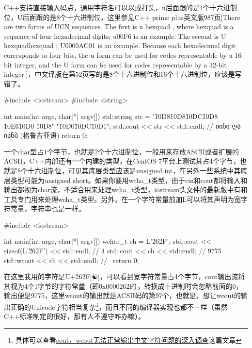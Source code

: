 C++支持直接输入\href{https://home.unicode.org/}{}码点，通用字符名可以以或打头，\mybackslash u后面跟的是4个十六进制位，\mybackslash U后面跟的是8个十六进制位，这里参见C++ prime plus英文版987页[There are two forms of UCN sequences. The first is \mybackslash u hexquad , where hexquad is a sequence of four hexadecimal digits; \mybackslash u00F6 is an example. The second is \mybackslash U hexquadhexquad ; \mybackslash U0000AC01 is an example. Because each hexadecimal digit corresponds to four bits, the \mybackslash u form can be used for codes representable by a 16-bit integer, and the \mybackslash U form can be used for codes representable by a 32-bit integer.]，中文译版在第52页写的是8个十六进制位和16个十六进制位，应该是写错了。

\begin{cpp}
#include <iostream>
#include <string>

int main(int argc, char|*| argv[]) {
    std::string str = "\u10D8\u10D8\u10DC\u10D8 \u10E6\u10D0 \u10D8"
        "\u10D0\u10DC\u10D1";
    std::cout << str << std::endl; // იინი ღა იანბ (格鲁吉亚语)
    return 0;
}
\end{cpp}

一个char型占1个字节，也就是2个十六进制位，一般用来存放ASCII或者扩展的ACSII，C++内部还有一个内建的类型，在CentOS 7平台上测试其占4个字节，也就是8个十六进制位，可见其底层类型应该是unsigned int，在另外一些系统中其底层类型可能为unsigned short。如果你要用wcha\_t类型，由于cin和cout都将输入和输出都视为char流，不适合用来处理wcha\_t类型，iostream头文件的最新版中有和工具专门用来处理wcha\_t类型。另外，在一个字符常量前加L可以将其声明为宽字符常量，字符串也是一样。

\begin{cpp}
#include <iostream>

int main(int argc, char|*| argv[]) {
    wchar_t ch = L'\u262F';
    std::cout << sizeof(L'\u262F') << std::endl; // 4
    std::cout << ch << std::endl; // 9775
    std::wcout << ch << std::endl; // \
    return 0;
}
\end{cpp}

在这里我用的字符是U+262F[☯]，可以看到宽字符常量占4个字节，cout输出流将其视为4个1字节的字符常量（即0x0000262F），转换成十进制时会忽略前面的0，输出便是9775，这里wcout的输出就是ACSII码的第97个，也就是\mybackslash ，想让wcout的输出正确的Unicode字符相当复杂\footnote{具体可以查看\href{https://www.cnblogs.com/zyl910/archive/2013/01/20/wchar_crtbug_01.html}{cout，wcout无法正常输出中文字符问题的深入调查}这篇文章}，而且不同的编译器实现也都不一样（虽然C++标准制定的很好，那有人不遵守咋办嘛）。

